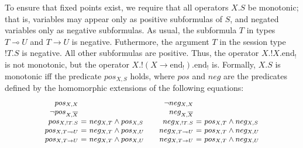 \documentclass[orivec,envcountsame]{llncs}
\makeatletter
\newcommand{\gvdual}[1]{\overline{#1}}
\newcommand{\gvout}[2]{{!#1.#2}}
\newcommand{\lto}{\ensuremath{\multimap}}
\newcommand{\uto}{\ensuremath{\rightarrow}}
\newcommand{\outterm}{\mathrm{end}_!}
\newcommand{\ba}{\begin{array}}
\newcommand{\ea}{\end{array}}
\newenvironment{eqs}{\ba{@{}r@{~}c@{~}l@{}}}{\ea}
\makeatother
\begin{document}
To ensure that fixed points exist, we require that all operators $X.S$ be monotonic; that is,
variables may appear only as positive subformulas of $S$, and negated variables only as negative
subformulas.  As usual, the subformula $T$ in types $T \lto U$ and $T \uto U$ is
negative. Futhermore, the argument $T$ in the session type $\gvout{T}{S}$ is negative. All other
subformulas are positive.  Thus, the operator $X.\gvout{X}{\outterm}$ is not monotonic, but the
operator $X.\gvout{(X \uto \outterm)}{\outterm}$ is.
%
Formally, $X.S$ is monotonic iff the predicate $pos_{X,S}$ holds, where $pos$ and $neg$ are the
predicates defined by the homomorphic extensions of the following equations:
\[
\small
\ba{@{}c@{\qquad}c@{}}
\begin{eqs}
pos_{X,X} \\
\neg pos_{X,\gvdual{X}} \\
pos_{X,!T.S} &=& neg_{X,T} \wedge pos_{X,S} \\
pos_{X,T \lto U} &=& neg_{X,T} \wedge pos_{X,U} \\
pos_{X,T \uto U} &=& neg_{X,T} \wedge pos_{X,U} \\
\end{eqs}
&
\begin{eqs}
\neg neg_{X,X} \\
neg_{X,\gvdual{X}} \\
neg_{X,!T.S} &=& pos_{X,T} \wedge neg_{X,S} \\
neg_{X,T \lto U} &=& pos_{X,T} \wedge neg_{X,U} \\
neg_{X,T \uto U} &=& pos_{X,T} \wedge neg_{X,U} \\
\end{eqs}
\ea
\]
\end{document}
